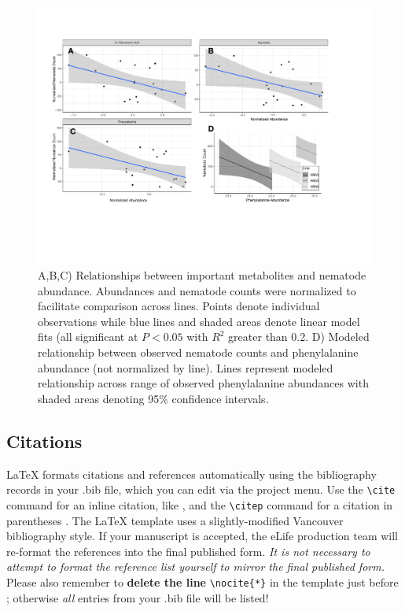 \documentclass[9pt,lineno]{elife}
\begin{document}
\begin{figure}
\includegraphics[width = 0.95\linewidth]{figures/publication_figures/figure-5.pdf}
\caption{A,B,C) Relationships between important metabolites and nematode abundance.  Abundances and nematode counts were normalized to facilitate comparison across lines.  Points denote individual observations while blue lines and shaded areas denote linear model fits (all significant at $P < 0.05$ with $R^2$ greater than 0.2.  D) Modeled relationship between observed nematode counts and phenylalanine abundance (not normalized by line).  Lines represent modeled relationship across range of observed phenylalanine abundances with shaded areas denoting 95\% confidence intervals. }
\label{fig:figure5}
\end{figure}







\subsection{Citations}

LaTeX formats citations and references automatically using the bibliography records in your .bib file, which you can edit via the project menu. Use the \verb|\cite| command for an inline citation, like \cite{Aivazian917}, and the \verb|\citep| command for a citation in parentheses \citep{Aivazian917}. The LaTeX template uses a slightly-modified Vancouver bibliography style. If your manuscript is accepted, the eLife production team will re-format the references into the final published form. \emph{It is not necessary to attempt to format the reference list yourself to mirror the final published form.} Please also remember to \textbf{delete the line} \verb|\nocite{*}| in the template just before \verb||; otherwise \emph{all} entries from your .bib file will be listed! 
\end{document}
